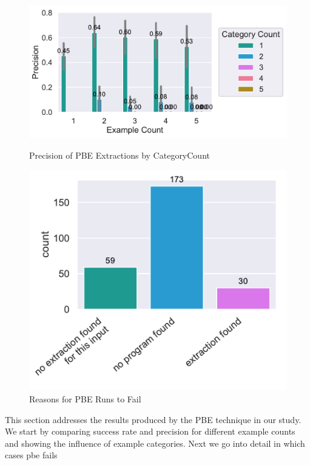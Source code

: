 \documentclass[\myrootdir/main.tex]{subfiles}
\begin{document}
\begin{figure}[htbp]
	\centering
	\begin{minipage}{0.45\textwidth}
		\centering
		\includegraphics[width=\textwidth, clip]{img/big-study/precision-categorycount-examplecount-PBE.pdf}
		\caption{Precision of PBE Extractions by CategoryCount}
		\label{fig:precision-categorycount-examplecount-pbe}
	\end{minipage}\hfill
	\begin{minipage}{0.45\textwidth}
		\centering
		\includegraphics[width=\textwidth, clip]{img/big-study/failure-reason-PBE.pdf}
		\caption{Reasons for PBE Runs to Fail}
		\label{fig:failure-reason-pbe}
	\end{minipage}
\end{figure}

This section addresses the results produced by the PBE technique in our study.
We start by comparing success rate and precision for different example counts and showing the influence of example categories.
Next we go into detail in which cases pbe fails
\end{document}
